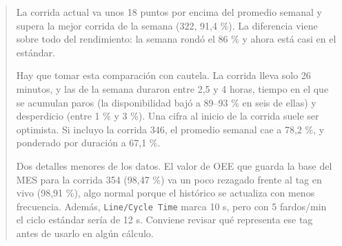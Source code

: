 \begin{quote}
La corrida actual va unos 18 puntos por encima del promedio semanal y supera la mejor corrida de la semana (322, 91,4 \%). La diferencia viene sobre todo del rendimiento: la semana rondó el 86 \% y ahora está casi en el estándar.

Hay que tomar esta comparación con cautela. La corrida lleva solo 26 minutos, y las de la semana duraron entre 2,5 y 4 horas, tiempo en el que se acumulan paros (la disponibilidad bajó a 89--93 \% en seis de ellas) y desperdicio (entre 1 \% y 3 \%). Una cifra al inicio de la corrida suele ser optimista. Si incluyo la corrida 346, el promedio semanal cae a 78,2 \%, y ponderado por duración a 67,1 \%.

Dos detalles menores de los datos. El valor de OEE que guarda la base del MES para la corrida 354 (98,47 \%) va un poco rezagado frente al tag en vivo (98,91 \%), algo normal porque el histórico se actualiza con menos frecuencia. Además, \texttt{Line/Cycle Time} marca 10 s, pero con 5 fardos/min el ciclo estándar sería de 12 s. Conviene revisar qué representa ese tag antes de usarlo en algún cálculo.
\end{quote}
